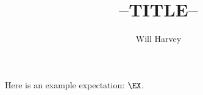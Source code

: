 \documentclass[12pt]{article}
\title{--TITLE--}
\author{Will Harvey}
\begin{document}
\maketitle

Here is an example expectation: $\EX$.
\end{document}
